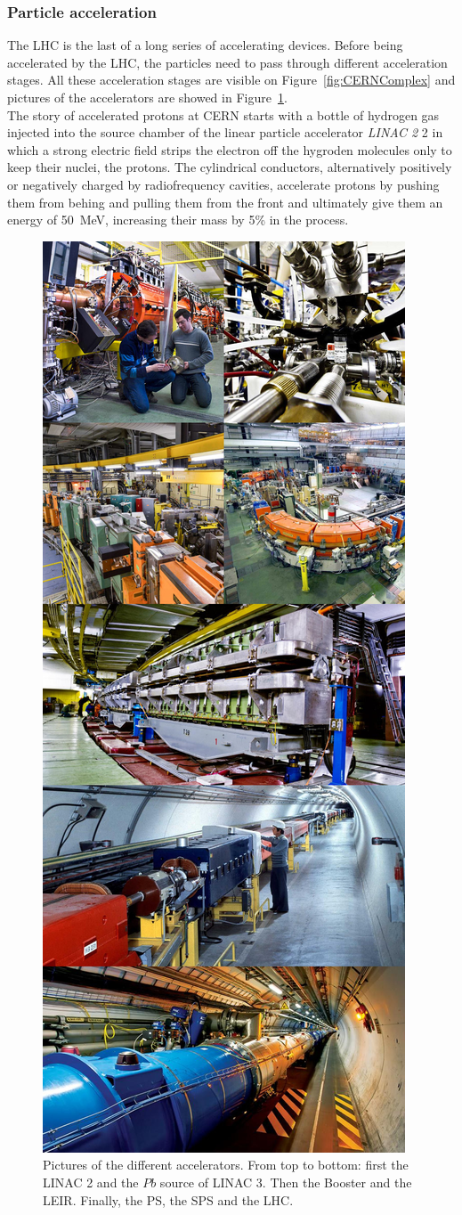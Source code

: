 		\subsubsection{Particle acceleration}
		\label{chapt2:sssec:acceleration}
	
	The LHC is the last of a long series of accelerating devices. Before being accelerated by the LHC, the particles need to pass through different acceleration stages. All these acceleration stages are visible on Figure~\ref{fig:CERNComplex} and pictures of the accelerators are showed in Figure~\ref{fig:CERNAccelerators}.\\
	
	The story of accelerated protons at CERN starts with a bottle of hydrogen gas injected into the source chamber of the linear particle accelerator \textit{LINAC 2} 2 in which a strong electric field strips the electron off the hygroden molecules only to keep their nuclei, the protons. The cylindrical conductors, alternatively positively or negatively charged by radiofrequency cavities, accelerate protons by pushing them from behing and pulling them from the front and ultimately give them an energy of \SI{50}{MeV}, increasing their mass by 5\% in the process.\\

	\begin{figure}[H]
		\centering
		\includegraphics[width=0.45\linewidth]{fig/chapt2/CERN-accelerators.jpg}
		\caption{\label{fig:CERNAccelerators} Pictures of the different accelerators. From top to bottom: first the LINAC 2 and the $Pb$ source of LINAC 3. Then the Booster and the LEIR. Finally, the PS, the SPS and the LHC.}
	\end{figure}
	
